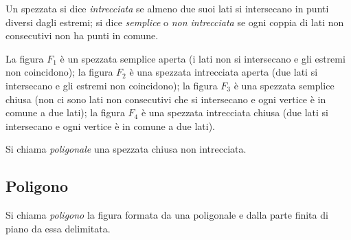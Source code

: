 \begin{definizione}
Un spezzata si dice \emph{intrecciata} se almeno due suoi lati si 
intersecano in punti diversi dagli estremi; si dice \emph{semplice} o 
\emph{non intrecciata} se ogni coppia di lati non consecutivi non ha 
punti in comune.
\end{definizione}

\begin{inaccessibleblock}
\begin{center}\end{center}
\end{inaccessibleblock}

La figura \(F_1\) è un spezzata semplice aperta (i lati non si 
intersecano e gli estremi non coincidono); la figura \(F_2\) è una 
spezzata intrecciata aperta (due lati si intersecano e gli estremi 
non coincidono); la figura \(F_3\) è una spezzata semplice chiusa (non 
ci sono lati non consecutivi che si intersecano e ogni vertice è in 
comune a due lati); la figura \(F_4\) è una spezzata intrecciata chiusa 
(due lati si intersecano e ogni vertice è in comune a due lati).

\begin{definizione}
Si chiama \emph{poligonale} una spezzata chiusa non intrecciata.
\end{definizione}

\subsection{Poligono}

\begin{definizione}
Si chiama \emph{poligono} la figura formata da una poligonale e dalla 
parte finita di piano da essa delimitata.
\end{definizione}


